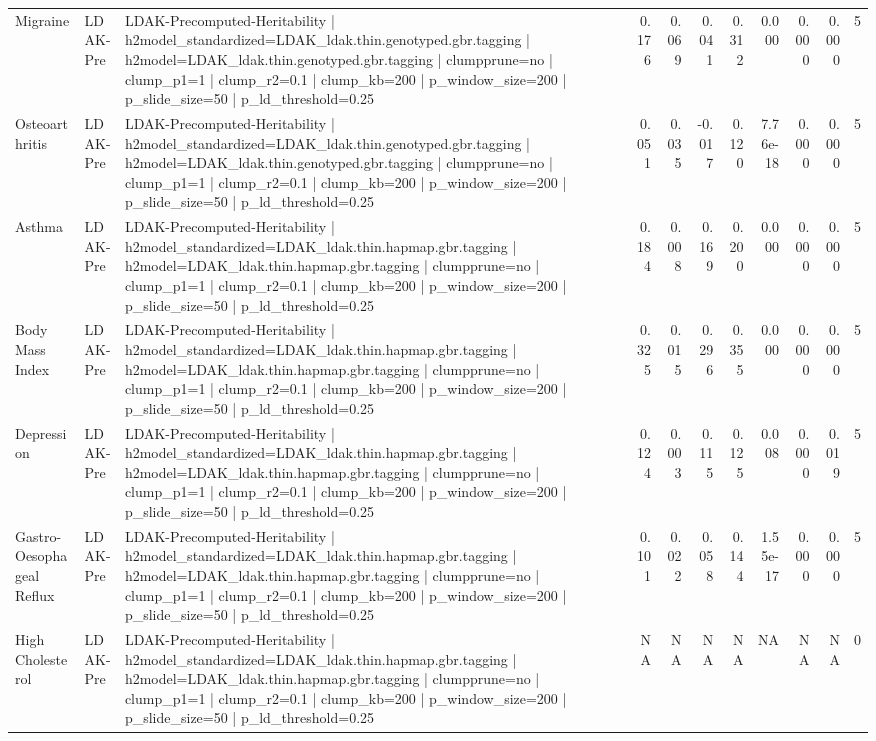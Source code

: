 \begin{landscape}
\begin{longtable}{p{2.4cm}p{1.8cm}p{6.0cm}rrrrrrrr}
Migraine & LDAK-Pre & LDAK-Precomputed-Heritability | h2model\_standardized=LDAK\_ldak.thin.genotyped.gbr.tagging | h2model=LDAK\_ldak.thin.genotyped.gbr.tagging | clumpprune=no | clump\_p1=1 | clump\_r2=0.1 | clump\_kb=200 | p\_window\_size=200 | p\_slide\_size=50 | p\_ld\_threshold=0.25 & 0.176 & 0.069 & 0.041 & 0.312 & 0.000 & 0.000 & 0.000 & 5 \\
Osteoarthritis & LDAK-Pre & LDAK-Precomputed-Heritability | h2model\_standardized=LDAK\_ldak.thin.genotyped.gbr.tagging | h2model=LDAK\_ldak.thin.genotyped.gbr.tagging | clumpprune=no | clump\_p1=1 | clump\_r2=0.1 | clump\_kb=200 | p\_window\_size=200 | p\_slide\_size=50 | p\_ld\_threshold=0.25 & 0.051 & 0.035 & -0.017 & 0.120 & 7.76e-18 & 0.000 & 0.000 & 5 \\
Asthma & LDAK-Pre & LDAK-Precomputed-Heritability | h2model\_standardized=LDAK\_ldak.thin.hapmap.gbr.tagging | h2model=LDAK\_ldak.thin.hapmap.gbr.tagging | clumpprune=no | clump\_p1=1 | clump\_r2=0.1 | clump\_kb=200 | p\_window\_size=200 | p\_slide\_size=50 | p\_ld\_threshold=0.25 & 0.184 & 0.008 & 0.169 & 0.200 & 0.000 & 0.000 & 0.000 & 5 \\
Body Mass Index & LDAK-Pre & LDAK-Precomputed-Heritability | h2model\_standardized=LDAK\_ldak.thin.hapmap.gbr.tagging | h2model=LDAK\_ldak.thin.hapmap.gbr.tagging | clumpprune=no | clump\_p1=1 | clump\_r2=0.1 | clump\_kb=200 | p\_window\_size=200 | p\_slide\_size=50 | p\_ld\_threshold=0.25 & 0.325 & 0.015 & 0.296 & 0.355 & 0.000 & 0.000 & 0.000 & 5 \\
Depression & LDAK-Pre & LDAK-Precomputed-Heritability | h2model\_standardized=LDAK\_ldak.thin.hapmap.gbr.tagging | h2model=LDAK\_ldak.thin.hapmap.gbr.tagging | clumpprune=no | clump\_p1=1 | clump\_r2=0.1 | clump\_kb=200 | p\_window\_size=200 | p\_slide\_size=50 | p\_ld\_threshold=0.25 & 0.124 & 0.003 & 0.115 & 0.125 & 0.008 & 0.000 & 0.019 & 5 \\
Gastro-Oesophageal Reflux & LDAK-Pre & LDAK-Precomputed-Heritability | h2model\_standardized=LDAK\_ldak.thin.hapmap.gbr.tagging | h2model=LDAK\_ldak.thin.hapmap.gbr.tagging | clumpprune=no | clump\_p1=1 | clump\_r2=0.1 | clump\_kb=200 | p\_window\_size=200 | p\_slide\_size=50 | p\_ld\_threshold=0.25 & 0.101 & 0.022 & 0.058 & 0.144 & 1.55e-17 & 0.000 & 0.000 & 5 \\
High Cholesterol & LDAK-Pre & LDAK-Precomputed-Heritability | h2model\_standardized=LDAK\_ldak.thin.hapmap.gbr.tagging | h2model=LDAK\_ldak.thin.hapmap.gbr.tagging | clumpprune=no | clump\_p1=1 | clump\_r2=0.1 | clump\_kb=200 | p\_window\_size=200 | p\_slide\_size=50 | p\_ld\_threshold=0.25 & NA & NA & NA & NA & NA & NA & NA & 0 \\

\end{longtable}
\end{landscape}

